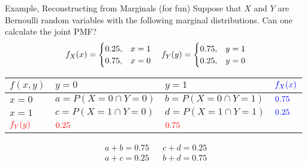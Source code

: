 \documentclass[handout]{beamer}
\newcommand{\blue}[1]{{\color{blue} #1}}
\newcommand{\red}[1]{{\color{red} #1}}
\begin{document}
\begin{frame}{Example, Reconstructing from Marginals (for fun)}
    Suppose that $X$ and $Y$ are Bernoulli random variables with the following marginal distributions. Can one calculate the joint PMF?
    $$
        f_X(x) = \begin{cases} 
            0.25 , & x=1 \\ 
            0.75, & x=0
        \end{cases}
        \hskip 1em
        f_Y(y) = \begin{cases} 
            0.75 , & y=1 \\ 
            0.25, & y=0
        \end{cases}
    $$
    \pause \begin{center}
        \begin{tabular}{l||l|l|l}
            $f(x,y)$ & $y=0$ & $y=1$  & $\blue{f_X(x)}$\\ \hline \hline
            $x=0$  & $a=P(X=0 \cap Y=0)$   & $b=P(X=0 \cap Y=1)$ & $\blue{0.75}$\\ \hline
            $x=1$  & $c=P(X=1 \cap Y=0)$   & $d=P(X=1 \cap Y=1)$& $\blue{0.25}$\\ \hline
            $\red{f_Y(y)}$ & $\red{0.25}$ & $\red{0.75}$ & \\
        \end{tabular}
    \end{center}
    \pause \begin{align*}
        a+b = 0.75 & & c+d=0.25\\
        a+c = 0.25 & & b+d=0.75\\
    \end{align*}
\end{frame}
\end{document}
